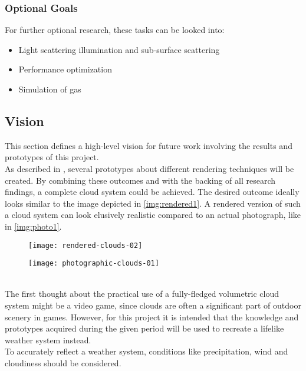\subsubsection{Optional Goals}
For further optional research, these tasks can be looked into:
\begin{itemize}
    \item Light scattering illumination and sub-surface scattering
    \item Performance optimization
    \item Simulation of gas
\end{itemize}

\clearpage

\subsection{Vision}
This section defines a high-level vision for future work involving the results and prototypes of this project. 
\\ 
As described in , several prototypes about different rendering techniques will be created.
By combining these outcomes and with the backing of all research findings, a complete cloud system could be achieved. 
The desired outcome ideally looks similar to the image depicted in \autoref{img:rendered1}. A rendered version of such a cloud system can look elusively realistic compared to an actual photograph, like in \autoref{img:photo1}.
\begin{figure}[ht]
    \centering
        \begin{minipage}{0.47\linewidth}
            \texttt{[image: rendered-clouds-02]}
            \label{img:rendered1}        
        \end{minipage}        
    \hfill
        \begin{minipage}{0.47\linewidth}
            \texttt{[image: photographic-clouds-01]}
            \label{img:photo1}        
        \end{minipage}  
\end{figure}
\\
The first thought about the practical use of a fully-fledged volumetric cloud system might be a video game, since clouds are often a significant part of outdoor scenery in games.
However, for this project it is intended that the knowledge and prototypes acquired during the given period will be used to recreate a lifelike weather system instead.
\\
To accurately reflect a weather system, conditions like precipitation, wind and cloudiness should be considered.


